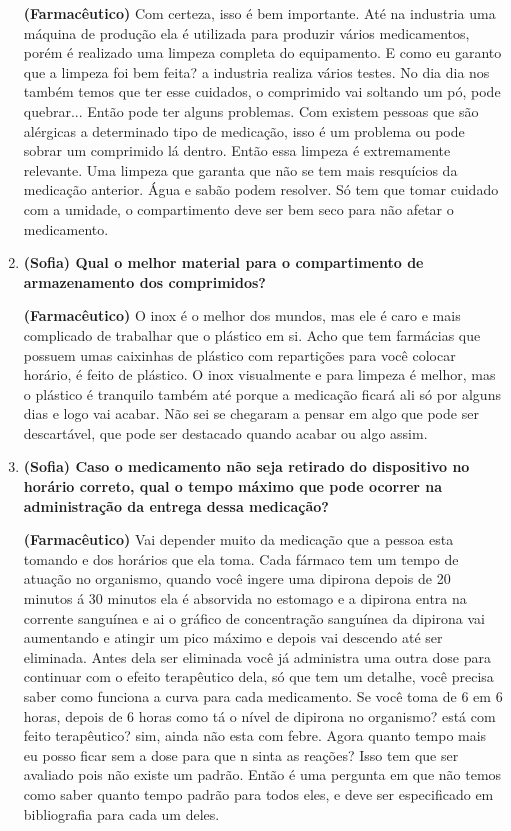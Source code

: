 \begin{apendicesenv}
\begin{enumerate}
\textbf{(Farmacêutico)} Com certeza, isso é bem importante. Até na industria uma máquina de produção ela é utilizada para produzir vários medicamentos, porém é realizado uma limpeza completa do equipamento. E como eu garanto que a limpeza foi bem feita? a industria realiza vários testes. No dia dia nos também temos que ter esse cuidados, o comprimido vai soltando um pó, pode quebrar... Então pode ter alguns problemas. Com existem pessoas que são alérgicas a determinado tipo de medicação, isso é um problema ou pode sobrar um comprimido lá dentro. Então essa limpeza é extremamente relevante. Uma limpeza que garanta que não se tem mais resquícios da medicação anterior. Água e sabão podem resolver. Só tem que tomar cuidado com a umidade, o compartimento deve ser bem seco para não afetar o medicamento.

\item \textbf{(Sofia) Qual o melhor material para o compartimento de armazenamento dos comprimidos?}

\textbf{(Farmacêutico)} O inox é o melhor dos mundos, mas ele é caro e mais complicado de trabalhar que o plástico em si. Acho que tem farmácias que possuem umas caixinhas de plástico com repartições para você colocar horário, é feito de plástico. O inox visualmente e para limpeza é melhor, mas o plástico é tranquilo também até porque a medicação ficará ali só por alguns dias e logo vai acabar. Não sei se chegaram a pensar em algo que pode ser descartável, que pode ser destacado quando acabar ou algo assim. 

\item \textbf{(Sofia) Caso o medicamento não seja retirado do dispositivo no horário correto, qual o tempo máximo que pode ocorrer na administração da entrega dessa medicação?}

\textbf{(Farmacêutico)} Vai depender muito da medicação que a pessoa esta tomando e dos horários que ela toma. Cada fármaco tem um tempo de atuação no organismo, quando você ingere uma dipirona depois de 20 minutos á 30 minutos ela é absorvida no estomago e a dipirona entra na corrente sanguínea e ai o gráfico de concentração sanguínea da dipirona vai aumentando e atingir um pico máximo e depois vai descendo até ser eliminada. Antes dela ser eliminada você já administra uma outra dose para continuar com o efeito terapêutico dela, só que tem um detalhe, você precisa saber como funciona a curva para cada medicamento. Se você toma de 6 em 6 horas, depois de 6 horas como tá o nível de dipirona no organismo? está com feito terapêutico? sim, ainda não esta com febre. Agora quanto tempo mais eu posso ficar sem a dose para que n sinta as reações? Isso tem que ser avaliado pois não existe um padrão. Então é uma pergunta em que não temos como saber quanto tempo padrão para todos eles, e deve ser especificado em bibliografia para cada um deles.


\end{enumerate}
\end{apendicesenv}
